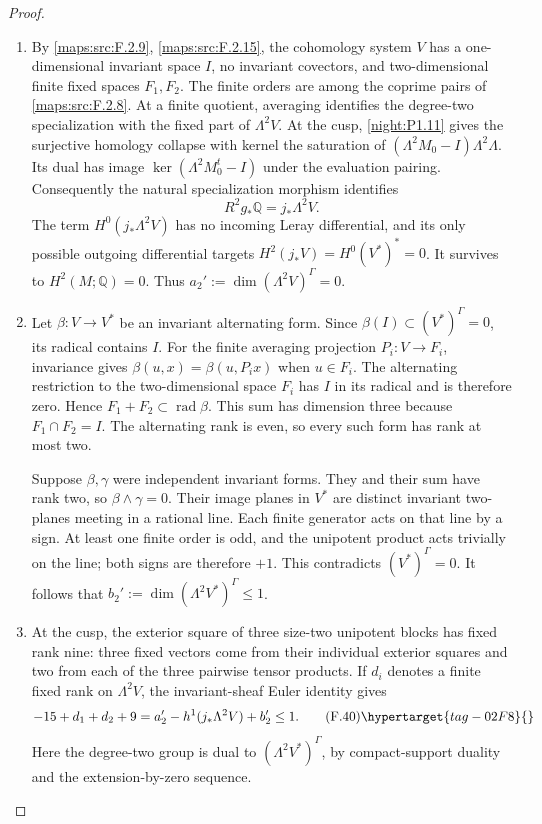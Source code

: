 \begin{proof}
\begin{enumerate}[label={$\langle1\rangle$\arabic*.}]
\item By \cref{maps:src:F.2.9}, \cref{maps:src:F.2.15}, the cohomology
system $V$ has a one-dimensional invariant space $I$, no invariant
covectors, and two-dimensional finite fixed spaces $F_1,F_2$.
The finite orders are among the coprime pairs of
\cref{maps:src:F.2.8}.  At a finite quotient, averaging identifies
the degree-two specialization with the fixed part of $\Lambda^2V$.
At the cusp, \cref{night:P1.11} gives the surjective homology
collapse with kernel the saturation of
$(\Lambda^2M_0-I)\Lambda^2\Lambda$.  Its dual has image
$\ker(\Lambda^2M_0^t-I)$ under the evaluation pairing.  Consequently
the natural specialization morphism identifies
\[
 R^2g_*\mathbb Q=j_*\Lambda^2V.
\]
The term $H^0(j_*\Lambda^2V)$ has no incoming Leray differential,
and its only possible outgoing differential targets
$H^2(j_*V)=H^0(V^*)^*=0$.  It survives to $H^2(M;\mathbb Q)=0$.
Thus $a_2':=\dim(\Lambda^2V)^\Gamma=0$.

\item Let $\beta:V\to V^*$ be an invariant alternating form.
Since $\beta(I)\subset(V^*)^\Gamma=0$, its radical contains $I$.
For the finite averaging projection $P_i:V\to F_i$, invariance gives
$\beta(u,x)=\beta(u,P_ix)$ when $u\in F_i$.
The alternating restriction to the two-dimensional space $F_i$
has $I$ in its radical and is therefore zero.  Hence
$F_1+F_2\subset\operatorname{rad}\beta$.  This sum has dimension
three because $F_1\cap F_2=I$.  The alternating rank is even,
so every such form has rank at most two.

Suppose $\beta,\gamma$ were independent invariant forms.
They and their sum have rank two, so
$\beta\wedge\gamma=0$.  Their image planes in $V^*$
are distinct invariant two-planes meeting in a rational line.
Each finite generator acts on that line by a sign.  At least one
finite order is odd, and the unipotent product acts trivially on the
line; both signs are therefore $+1$.  This contradicts
$(V^*)^\Gamma=0$.  It follows that
$b_2':=\dim(\Lambda^2V^*)^\Gamma\leq1$.

\item At the cusp, the exterior square of three size-two unipotent
blocks has fixed rank nine: three fixed vectors come from their
individual exterior squares and two from each of the three pairwise
tensor products.  If $d_i$ denotes a finite fixed rank on
$\Lambda^2V$, the invariant-sheaf Euler identity gives
\[
 -15+d_1+d_2+9
 =a_2'-h^1(j_*\Lambda^2V)+b_2'\leq1.
 \tag{F.40}\hypertarget{tag-02F8}{}\label{maps:eq:F.40}
\]
Here the degree-two group is dual to
$(\Lambda^2V^*)^\Gamma$, by compact-support duality and the
extension-by-zero sequence.


\end{enumerate}
\end{proof}
